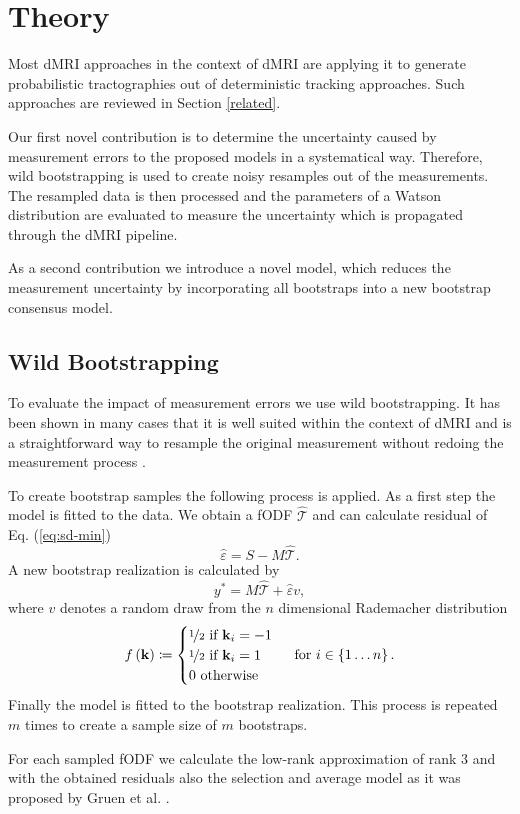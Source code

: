 \section{Theory}
Most dMRI approaches in the context of dMRI are applying it to generate
probabilistic tractographies out of deterministic tracking approaches. Such
approaches are reviewed in Section \ref{related}. 

Our first novel contribution is to determine the uncertainty caused by
measurement errors to the proposed models in a systematical way. Therefore, wild bootstrapping is used to create
noisy resamples out of the measurements. The resampled data is then processed
and the parameters of a Watson distribution are evaluated to measure the
uncertainty which is propagated through the dMRI pipeline. 

As a second contribution we introduce a novel model, which reduces the measurement
uncertainty by incorporating all bootstraps into a new bootstrap consensus model.

\subsection{Wild Bootstrapping}
To evaluate the impact of measurement errors we use wild bootstrapping. It
has been shown in many cases that it is well suited within the context of dMRI and
is a straightforward way to
resample the original measurement without redoing the measurement process
\cite{Jones:2008}.

To create bootstrap samples the following process is applied. As a first step the model is fitted to the data. We obtain a fODF
$\hat{\mathcal{T}}$ and can calculate residual of Eq. (\ref{eq:sd-min}) 
\[ \hat{\varepsilon} = S - M\hat{\mathcal{T}} .\] 
A new bootstrap realization is calculated by 
\[ y^{*} = M\hat{\mathcal{T}}  + \hat{\varepsilon} v , \]
where $v$ denotes a random draw from the $n$ dimensional Rademacher distribution
\[ f \left( \mathbf{k} \right) \coloneqq  \begin{cases} \nicefrac{1}{2} \text{ if }
		\mathbf{k}_i=-1 \\
		\nicefrac{1}{2} \text{ if } \mathbf{k}_i=1 \\
		0 \text { otherwise } 
\end{cases} \text{ for } i \in \left\{ 1\dots n \right\} . \]
 Finally the model is fitted to the bootstrap realization. This process is repeated $m$
times to create a sample size of $m$ bootstraps.

For each sampled fODF we calculate the low-rank approximation of rank $3$
and with the obtained residuals also the selection and average model as it was
proposed by Gruen et al. \cite{Gruen:2021}.

